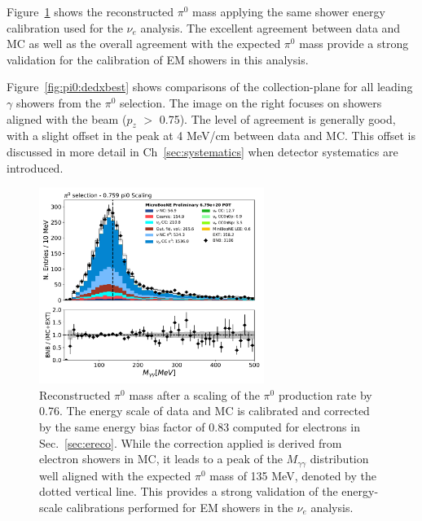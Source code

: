 Figure~\ref{fig:pi0massscaled} shows the reconstructed $\pi^0$ mass applying the same shower energy calibration used for the $\nu_e$ analysis. The excellent agreement between data and MC as well as the overall agreement with the expected $\pi^0$ mass provide a strong validation for the calibration of EM showers in this analysis.

Figure~\ref{fig:pi0:dedxbest} shows comparisons of the collection-plane \dedx for all leading $\gamma$ showers from the $\pi^0$ selection. The image on the right focuses on showers aligned with the beam ($p_z$ $>$ 0.75). The level of agreement is generally good, with a slight offset in the \dedx peak at 4 MeV/cm  between data and MC. This offset is discussed in more detail in Ch~\ref{sec:systematics} when detector systematics are introduced. 


\begin{figure}[H]
\begin{center}
\includegraphics[width=0.65\textwidth]{pi0/calorimetry/pi0_mass_Y_corr_run123.pdf}
\caption{\label{fig:pi0massscaled}Reconstructed $\pi^0$ mass after a scaling of the $\pi^0$ production rate by 0.76. The energy scale of data and MC is calibrated and corrected by the same energy bias factor of $0.83$ computed for electrons in Sec.~\ref{sec:ereco}. While the correction applied is derived from electron showers in MC, it leads to a peak of the $M_{\gamma\gamma}$ distribution well aligned with the expected $\pi^0$ mass of 135 MeV, denoted by the dotted vertical line. This provides a strong validation of the energy-scale calibrations performed for EM showers in the $\nu_e$ analysis.}
\end{center}
\end{figure}


